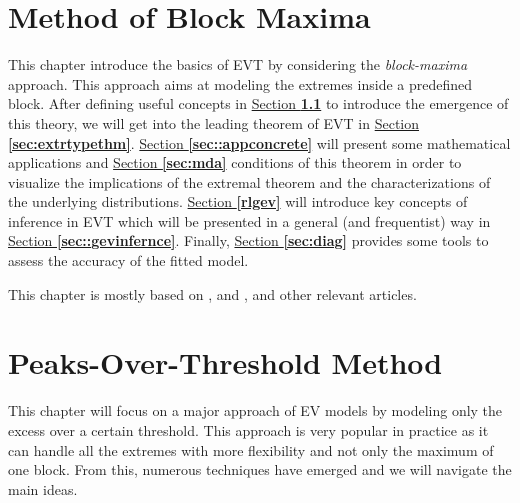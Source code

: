 \documentclass[11pt,a4paper,openany, twosided]{book}
\begin{document}
\setcounter{mtc}{1}
\chapter{Method of Block Maxima} \label{sec::1}
\vspace{-1cm}
\minitoc \thispagestyle{empty}
 \vspace{1cm}

This chapter introduce the basics of EVT by considering the \textit{block-maxima} approach. This approach aims at modeling the extremes inside a predefined block. 
After defining useful concepts in 
\hyperref[sec::1.1]{Section \textbf{1.1}} to introduce the emergence of this theory, we will get into the leading theorem of EVT in \hyperref[sec:extrtypethm]{Section \textbf{\ref{sec:extrtypethm}}}. \hyperref[sec::appconcrete]{Section \textbf{\ref{sec::appconcrete}}} will present some mathematical applications and \hyperref[sec:mda]{Section \textbf{\ref{sec:mda}}} conditions  of this theorem in order to visualize the implications of the extremal theorem and the characterizations of the underlying distributions. \hyperref[rlgev]{Section \textbf{\ref{rlgev}}} will introduce key concepts of inference in EVT which will be presented in a general (and frequentist) way in  \hyperref[sec::gevinfernce]{Section \textbf{\ref{sec::gevinfernce}}}. Finally, \hyperref[sec:diag]{Section \textbf{\ref{sec:diag}}} provides some tools to assess the accuracy of the fitted model.

This chapter is mostly based on \citet[chap.3]{coles_introduction_2001}, \citet[chap.2]{beirlant_statistics_2006} and \citet[chap.1-4]{reiss_statistical_2007}, and other relevant articles.

\newpage




\chapter{Peaks-Over-Threshold Method}\label{sec::2}
\vspace{-1cm}
\minitoc \thispagestyle{empty}
 \vspace{1cm}

This chapter will focus on a major approach of EV models by modeling only the excess over a certain threshold. This approach is very popular in practice as it can handle all the extremes with more flexibility and not only the maximum of one block. From this, numerous techniques have emerged and we will navigate the main ideas.
\end{document}
